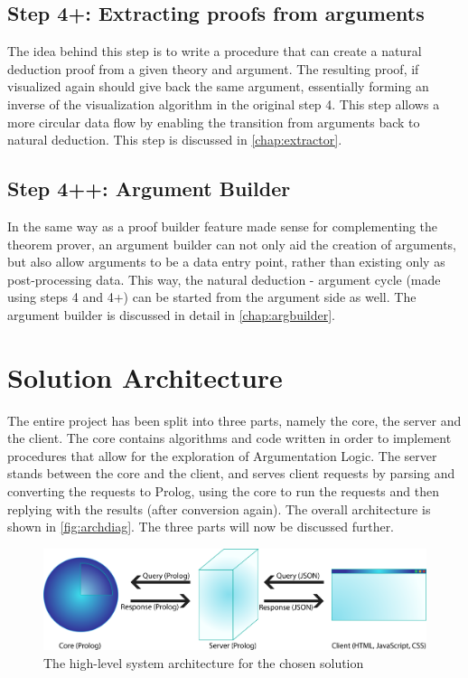 \documentclass[11pt,twoside,a4paper]{report}
\begin{document}
\subsection{Step 4+: Extracting proofs from arguments}
The idea behind this step is to write a procedure that can create a natural deduction proof from a given theory and argument. The resulting proof, if visualized again should give back the same argument, essentially forming an inverse of the visualization algorithm in the original step 4. This step allows a more circular data flow by enabling the transition from arguments back to natural deduction. This step is discussed in \autoref{chap:extractor}.

\subsection{Step 4++: Argument Builder}
In the same way as a proof builder feature made sense for complementing the theorem prover, an argument builder can not only aid the creation of arguments, but also allow arguments to be a data entry point, rather than existing only as post-processing data. This way, the natural deduction - argument cycle (made using steps 4 and 4+) can be started from the argument side as well. The argument builder is discussed in detail in \autoref{chap:argbuilder}.

\section{Solution Architecture}
\label{sec:solarch}
The entire project has been split into three parts, namely the core, the server and the client. The core contains algorithms and code written in order to implement procedures that allow for the exploration of Argumentation Logic. The server stands between the core and the client, and serves client requests by parsing and converting the requests to Prolog, using the core to run the requests and then replying with the results (after conversion again). The overall architecture is shown in \autoref{fig:archdiag}. The three parts will now be discussed further.

\begin{figure}[h]
\centerline{\includegraphics[scale=0.5]{img/system-diagram.png}}
\caption{The high-level system architecture for the chosen solution\label{fig:archdiag}}
\end{figure}
\end{document}
